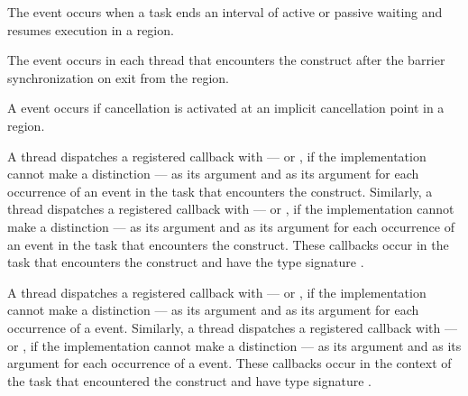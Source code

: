 The  event occurs when a task ends an interval of 
active or passive waiting and resumes execution in a  region.

The  event occurs in each thread that encounters the
 construct after the barrier synchronization on exit from the
 region.

A  event occurs if cancellation is activated at an implicit 
cancellation point in a  region.

\tools

A thread dispatches a registered 
callback with  --- or
, if the implementation cannot make a
distinction --- as its  argument and  
as its  argument for each occurrence of an  
event in the task that encounters the  construct. Similarly, 
a thread dispatches a registered  callback 
with  --- or , 
if the implementation cannot make a distinction --- as its  argument 
and  as its  argument for each  occurrence 
of an  event in the task that encounters the 
 construct. These callbacks occur in the task that encounters 
the  construct and have the type signature 
.

A thread dispatches a registered  callback
with  --- or , 
if the implementation cannot make a distinction --- as its  argument and
 as its  argument for each occurrence of 
a  event. Similarly, a thread dispatches a registered 
 callback with 
 --- or , 
if the implementation cannot make a distinction --- as its  argument and
 as its  argument for each occurrence of a 
 event. These callbacks occur in the context of the task 
that encountered the  construct and have type signature 
.

